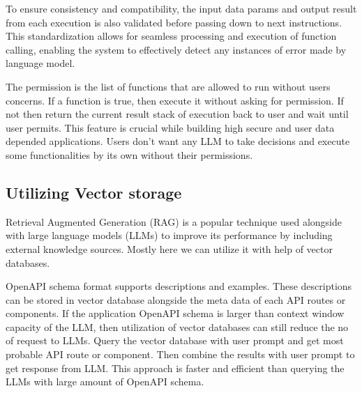 \documentclass[conference]{IEEEtran}
\begin{document}
To ensure consistency and compatibility, the input data params and output result from each execution is also validated before passing down to next instructions. This standardization allows for seamless processing and execution of function calling, enabling the system to effectively detect any instances of error made by language model.

The permission is the list of functions that are allowed to run without users concerns. If a function is true, then execute it without asking for permission. If not then return the current result stack of execution back to user and wait until user permits. This feature is crucial while building high secure and user data depended applications. Users don't want any LLM to take decisions and execute some functionalities by its own without their permissions.







\subsection{Utilizing Vector storage}
Retrieval Augmented Generation (RAG) is a popular technique used alongside with large language models (LLMs) to improve its performance by including external knowledge sources. Mostly here we can utilize it with help of vector databases. 

OpenAPI schema format supports descriptions and examples. These descriptions can be stored in vector database alongside the meta data of each API routes or components. If the application OpenAPI schema is larger than context window capacity of the LLM, then utilization of vector databases can still reduce the no of request to LLMs. Query the vector database with user prompt and get most probable API route or component. Then combine the results with user prompt to get response from LLM. This approach is faster and efficient than querying the LLMs with large amount of OpenAPI schema.
\end{document}
